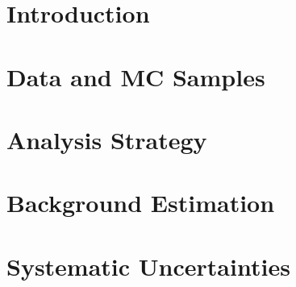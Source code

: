 \documentclass[NOTE, atlasdraft=true, texlive=2019, UKenglish]{atlasdoc}
\begin{document}
\maketitle

\tableofcontents



\section{Introduction}\label{Intro}
\label{sec:intro}




\section{Data and MC Samples}\label{DataMC}
\label{sec:samples}




\section{Analysis Strategy}\label{Ana}
\label{sec:analysis}



\section{Background Estimation}\label{BG}
\label{sec:background}



\section{Systematic Uncertainties}\label{Sys}
\label{sec:syst}
\end{document}
